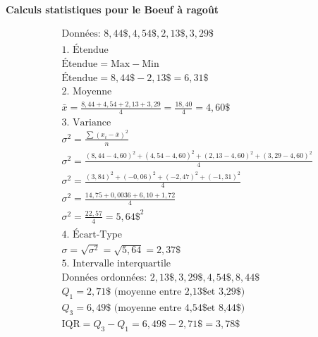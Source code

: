 \documentclass{article}
\begin{document}
\textbf{Calculs statistiques pour le Boeuf à ragoût}

\begin{align*}
&\text{Données: } 8,44\$, 4,54\$, 2,13\$, 3,29\$ \\[1em]
&\text{1. Étendue} \\
&\text{Étendue} = \text{Max} - \text{Min} \\
&\text{Étendue} = 8,44\$ - 2,13\$ = 6,31\$ \\[1em]
&\text{2. Moyenne} \\
&\bar{x} = \frac{8,44 + 4,54 + 2,13 + 3,29}{4} = \frac{18,40}{4} = 4,60\$ \\[1em]
&\text{3. Variance} \\
&\sigma^2 = \frac{\sum(x_i - \bar{x})^2}{n} \\
&\sigma^2 = \frac{(8,44-4,60)^2 + (4,54-4,60)^2 + (2,13-4,60)^2 + (3,29-4,60)^2}{4} \\
&\sigma^2 = \frac{(3,84)^2 + (-0,06)^2 + (-2,47)^2 + (-1,31)^2}{4} \\
&\sigma^2 = \frac{14,75 + 0,0036 + 6,10 + 1,72}{4} \\
&\sigma^2 = \frac{22,57}{4} = 5,64\$^2 \\[1em]
&\text{4. Écart-Type} \\
&\sigma = \sqrt{\sigma^2} = \sqrt{5,64} = 2,37\$ \\[1em]
&\text{5. Intervalle interquartile} \\
&\text{Données ordonnées: } 2,13\$, 3,29\$, 4,54\$, 8,44\$ \\
&Q_1 = 2,71\$ \text{ (moyenne entre 2,13\$ et 3,29\$)} \\
&Q_3 = 6,49\$ \text{ (moyenne entre 4,54\$ et 8,44\$)} \\
&\text{IQR} = Q_3 - Q_1 = 6,49\$ - 2,71\$ = 3,78\$
\end{align*}
\end{document}
